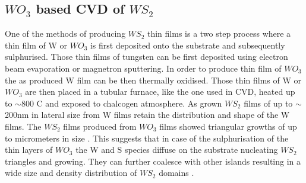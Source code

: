 \subsection{$WO_3$ based CVD of $WS_2$}
One of the methods of producing $WS_2$ thin films is a two step process where a thin film of W or $WO_3$ is first deposited onto the substrate and subsequently sulphurised. Those thin films of tungsten can be first deposited using electron beam evaporation or magnetron sputtering. In order to produce thin film of $WO_3$ the as produced W film can be then thermally oxidised. Those thin films of W or $WO_3$ are then placed in a tubular furnace, like the one used in CVD, heated up to $\sim$800 {\degree}C and exposed to chalcogen atmosphere. As grown $WS_2$ films of up to $\sim$200nm in lateral size from W films retain the distribution and shape of the W films. The $WS_2$ films produced from $WO_3$ films showed triangular growths of up to micrometers in size . This suggests that in case of the sulphurisation of the thin layers of $WO_3$ the W and S species diffuse on the substrate nucleating $WS_2$ triangles and growing. They can further coalesce with other islands resulting in a wide size and density distribution of $WS_2$ domains \cite{doi:10.1021/nn400971k}\cite{Reale2016}.


